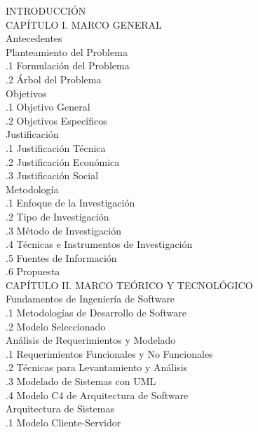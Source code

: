 \documentclass{univalle-perfil}
\begin{document}
\begin{indicetentativo}
INTRODUCCIÓN \\[2pt]
CAPÍTULO I. MARCO GENERAL \\
 Antecedentes \\
 Planteamiento del Problema \\
\quad{}.1 Formulación del Problema \\
\quad{}.2 Árbol del Problema \\
 Objetivos \\
\quad{}.1 Objetivo General \\
\quad{}.2 Objetivos Específicos \\
 Justificación \\
\quad{}.1 Justificación Técnica \\
\quad{}.2 Justificación Económica \\
\quad{}.3 Justificación Social \\
 Metodología \\
\quad{}.1 Enfoque de la Investigación \\
\quad{}.2 Tipo de Investigación \\
\quad{}.3 Método de Investigación \\
\quad{}.4 Técnicas e Instrumentos de Investigación \\
\quad{}.5 Fuentes de Información \\
\quad{}.6 Propuesta \\[2pt]
CAPÍTULO II. MARCO TEÓRICO Y TECNOLÓGICO \\
 Fundamentos de Ingeniería de Software \\
\quad{}.1 Metodologías de Desarrollo de Software \\
\quad{}.2 Modelo Seleccionado \\
 Análisis de Requerimientos y Modelado \\
\quad{}.1 Requerimientos Funcionales y No Funcionales \\
\quad{}.2 Técnicas para Levantamiento y Análisis \\
\quad{}.3 Modelado de Sistemas con UML \\
\quad{}.4 Modelo C4 de Arquitectura de Software \\
 Arquitectura de Sistemas \\
\quad{}.1 Modelo Cliente-Servidor \\

\end{indicetentativo}
\end{document}
